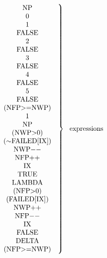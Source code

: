 \[ \left. {\mbox{ \begin{tabular}{c}
   NP \\
   0 \\
   1 \\
   FALSE \\
   2 \\
   FALSE \\
   3 \\
   FALSE \\
   4 \\
   FALSE \\
   5 \\
   FALSE \\
   (NFP$>$=NWP) \\
   1 \\
   NP \\
   (NWP$>$0) \\
   ($\sim$FAILED[IX]) \\
   NWP$-$$-$ \\
   NFP$+$$+$ \\
   IX \\
   TRUE \\
   LAMBDA \\
   (NFP$>$0) \\
   (FAILED[IX]) \\
   NWP$+$$+$ \\
   NFP$-$$-$ \\
   IX \\
   FALSE \\
   DELTA \\
   (NFP$>$=NWP) \\
\end{tabular} }} \right\} ~~ \mbox{expressions} \]


